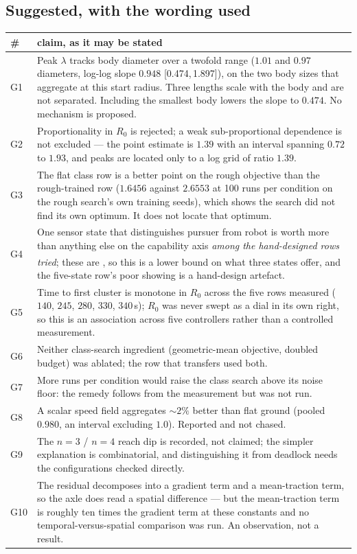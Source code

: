 \documentclass[11pt,a4paper]{article}
\newcommand{\ddg}{\textsuperscript{\ddag}}
\newcommand{\CI}[2]{[#1,\,#2]}
\begin{document}
\subsection*{Suggested, with the wording used}

\begin{longtable}{p{}p{}}
\toprule
\# & claim, as it may be stated \\
\midrule
\endhead
G1 & Peak $\lambda$ tracks body diameter over a twofold range ($1.01$ and $0.97$ diameters, log-log slope $0.948$ \CI{0.474}{1.897}), on the two body sizes that aggregate at this start radius. Three lengths scale with the body and are not separated. Including the smallest body lowers the slope to $0.474$. No mechanism is proposed. \\
G2 & Proportionality in $R_0$ is rejected; a weak sub-proportional dependence is not excluded --- the point estimate is $1.39$ with an interval spanning $0.72$ to $1.93$, and peaks are located only to a log grid of ratio $1.39$. \\
G3 & The flat class row is a better point on the rough objective than the rough-trained row ($1.6456$ against $2.6553$ at 100 runs per condition on the rough search's own training seeds), which shows the search did not find its own optimum. It does not locate that optimum. \\
G4 & One sensor state that distinguishes pursuer from robot is worth more than anything else on the capability axis \emph{among the hand-designed rows tried}; these are \ddg, so this is a lower bound on what three states offer, and the five-state row's poor showing is a hand-design artefact. \\
G5 & Time to first cluster is monotone in $R_0$ across the five rows measured ($140$, $245$, $280$, $330$, $340$\,s); $R_0$ was never swept as a dial in its own right, so this is an association across five controllers rather than a controlled measurement. \\
G6 & Neither class-search ingredient (geometric-mean objective, doubled budget) was ablated; the row that transfers used both. \\
G7 & More runs per condition would raise the class search above its noise floor: the remedy follows from the measurement but was not run. \\
G8 & A scalar speed field aggregates $\sim\!2\%$ better than flat ground (pooled $0.980$, an interval excluding $1.0$). Reported and not chased. \\
G9 & The $n = 3$ / $n = 4$ reach dip is recorded, not claimed; the simpler explanation is combinatorial, and distinguishing it from deadlock needs the configurations checked directly. \\
G10 & The residual decomposes into a gradient term and a mean-traction term, so the axle does read a spatial difference --- but the mean-traction term is roughly ten times the gradient term at these constants and no temporal-versus-spatial comparison was run. An observation, not a result. \\
\bottomrule
\end{longtable}
\end{document}
